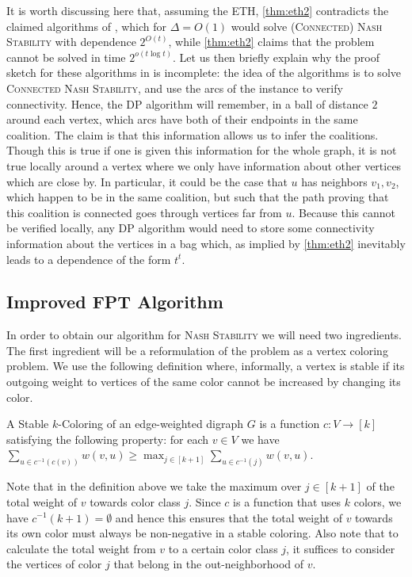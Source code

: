 \documentclass[letterpaper,USenglish,cleveref, autoref, thm-restate]{lipics-v2021}
\begin{document}
It is worth discussing here that, assuming the ETH, \cref{thm:eth2} contradicts
the claimed algorithms of \cite{Peters16a}, which for $\Delta=O(1)$ would solve
\textsc{(Connected) Nash Stability} with dependence $2^{O(t)}$, while
\cref{thm:eth2} claims that the problem cannot be solved in time $2^{o(t\log t)}$.
Let us then briefly explain why the proof sketch for these algorithms in
\cite{Peters16a} is incomplete: the idea of the algorithms is to solve
\textsc{Connected Nash Stability}, and use the arcs of the instance to verify
connectivity. Hence, the DP algorithm will remember, in a ball of distance $2$
around each vertex, which arcs have both of their endpoints in the same
coalition. The claim is that this information allows us to infer the
coalitions. Though this is true if one is given this information for the whole
graph, it is not true locally around a vertex where we only have information
about other vertices which are close by.  In particular, it could be the case
that $u$ has neighbors $v_1,v_2$, which happen to be in the same coalition, but
such that the path proving that this coalition is connected goes through
vertices far from $u$. Because this cannot be verified locally, any DP
algorithm would need to store some connectivity information about the vertices
in a bag which, as implied by \cref{thm:eth2} inevitably leads to a dependence
of the form $t^t$. 

\subsection{Improved FPT Algorithm}\label{sec:algtwd}

In order to obtain our algorithm for \textsc{Nash Stability} we will need two
ingredients.  The first ingredient will be a reformulation of the problem as a
vertex coloring problem.  We use the following definition where, informally, a
vertex is stable if its outgoing weight to vertices of the same color cannot be
increased by changing its color.

\begin{definition} A Stable $k$-Coloring of an edge-weighted digraph $G$ is a
function $c:V\to [k]$ satisfying the following property: for each $v\in V$ we
have $\sum_{u\in c^{-1}(c(v))} w(v,u) \ge \max_{j\in [k+1]} \sum_{u\in
c^{-1}(j)} w(v,u)$.  \end{definition}

Note that in the definition above we take the maximum over $j\in [k+1]$ of the
total weight of $v$ towards color class $j$. Since $c$ is a function that uses
$k$ colors, we have $c^{-1}(k+1)=\emptyset$ and hence this ensures that the
total weight of $v$ towards its own color must always be non-negative in a
stable coloring. Also note that to calculate the total weight from $v$ to a
certain color class $j$, it suffices to consider the vertices of color $j$ that
belong in the out-neighborhood of $v$.
\end{document}

